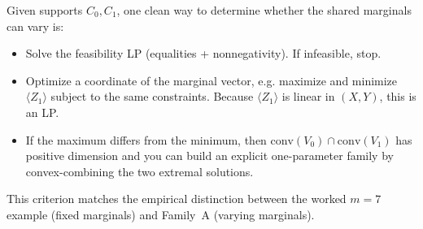 \documentclass[11pt]{article}
\begin{document}
Given supports $C_0,C_1$, one clean way to determine whether the shared marginals can vary is:
\begin{itemize}
\item Solve the feasibility LP (equalities + nonnegativity). If infeasible, stop.
\item Optimize a coordinate of the marginal vector, e.g. maximize and minimize $\langle Z_1\rangle$ subject to the same constraints. Because $\langle Z_1\rangle$ is linear in $(X,Y)$, this is an LP.
\item If the maximum differs from the minimum, then $\mathrm{conv}(V_0)\cap\mathrm{conv}(V_1)$ has positive dimension and you can build an explicit one-parameter family by convex-combining the two extremal solutions.
\end{itemize}
This criterion matches the empirical distinction between the worked $m=7$ example (fixed marginals) and Family~A (varying marginals).
\end{document}
